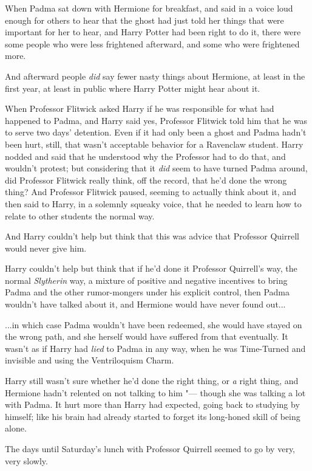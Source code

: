 When Padma sat down with Hermione for breakfast, and said in a voice
loud enough for others to hear that the ghost had just told her things
that were important for her to hear, and Harry Potter had been right to
do it, there were some people who were less frightened afterward, and
some who were frightened more.

And afterward people \emph{did} say fewer nasty things about Hermione,
at least in the first year, at least in public where Harry Potter might
hear about it.

When Professor Flitwick asked Harry if he was responsible for what had
happened to Padma, and Harry said yes, Professor Flitwick told him that
he was to serve two days' detention. Even if it had only been a ghost
and Padma hadn't been hurt, still, that wasn't acceptable behavior for a
Ravenclaw student. Harry nodded and said that he understood why the
Professor had to do that, and wouldn't protest; but considering that it
\emph{did} seem to have turned Padma around, did Professor Flitwick
really think, off the record, that he'd done the wrong thing? And
Professor Flitwick paused, seeming to actually think about it, and then
said to Harry, in a solemnly squeaky voice, that he needed to learn how
to relate to other students the normal way.

And Harry couldn't help but think that this was advice that Professor
Quirrell would never give him.

Harry couldn't help but think that if he'd done it Professor Quirrell's
way, the normal \emph{Slytherin} way, a mixture of positive and negative
incentives to bring Padma and the other rumor-mongers under his explicit
control, then Padma wouldn't have talked about it, and Hermione would
have never found out...

...in which case Padma wouldn't have been redeemed, she would have
stayed on the wrong path, and she herself would have suffered from that
eventually. It wasn't as if Harry had \emph{lied} to Padma in any way,
when he was Time-Turned and invisible and using the Ventriloquism Charm.

Harry still wasn't sure whether he'd done the right thing, or \emph{a}
right thing, and Hermione hadn't relented on not talking to him "--- though
she was talking a lot with Padma. It hurt more than Harry had expected,
going back to studying by himself; like his brain had already started to
forget its long-honed skill of being alone.

The days until Saturday's lunch with Professor Quirrell seemed to go by
very, very slowly.
